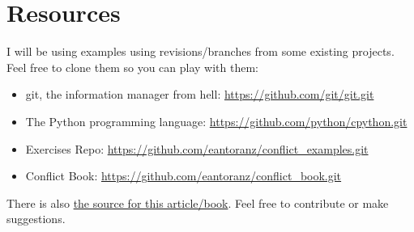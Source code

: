 
\section{Resources}

I will be using examples using revisions/branches from some existing projects. Feel free to clone them so you can play with them:

\begin{itemize}

	\item git, the information manager from hell: \url{https://github.com/git/git.git}
	\label{git_repo}

	\item The Python programming language: \url{https://github.com/python/cpython.git}
	\label{python_repo}
	
	\item Exercises Repo: \url{https://github.com/eantoranz/conflict_examples.git}
	\label{exercises_repo}

	\item Conflict Book: \url{https://github.com/eantoranz/conflict_book.git}
	\label{exercises_repo}
	
\end{itemize}

There is also \href{https://github.com/eantoranz/conflict_book.git}{the source for this article/book}.
Feel free to contribute or make suggestions.
